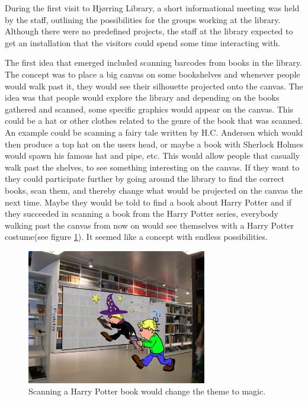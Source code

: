 During the first visit to Hj{\o}rring Library, a short informational meeting was held by the staff, outlining the possibilities for the groups working at the library. Although there were no predefined projects, the staff at the library expected to get an installation that the visitors could spend some time interacting with.

The first idea that emerged included scanning barcodes from books in the library. The concept was to place a big canvas on some bookshelves and whenever people would walk past it, they would see their silhouette projected onto the canvas. The idea was that people would explore the library and depending on the books gathered and scanned, some specific graphics would appear on the canvas. This could be a hat or other clothes related to the genre of the book that was scanned. An example could be scanning a fairy tale written by H.C. Andersen which would then produce a top hat on the users head, or maybe a book with Sherlock Holmes would spawn his famous hat and pipe, etc. This would allow people that casually walk past the shelves, to see something interesting on the canvas. If they want to they could participate further by going around the library to find the correct books, scan them, and thereby change what would be projected on the canvas the next time. Maybe they would be told to find a book about Harry Potter and if they succeeded in scanning a book from the Harry Potter series, everybody walking past the canvas from now on would see themselves with a Harry Potter costume(see figure \ref{fig:bookTheme}). It seemed like a concept with endless possibilities.

\begin{figure}[htbp]
\centering
\includegraphics[width=0.7\textwidth]{Pictures/HjoerringLibrary/magician.png}
\caption{Scanning a Harry Potter book would change the theme to magic.}
\label{fig:bookTheme}
\end{figure}

